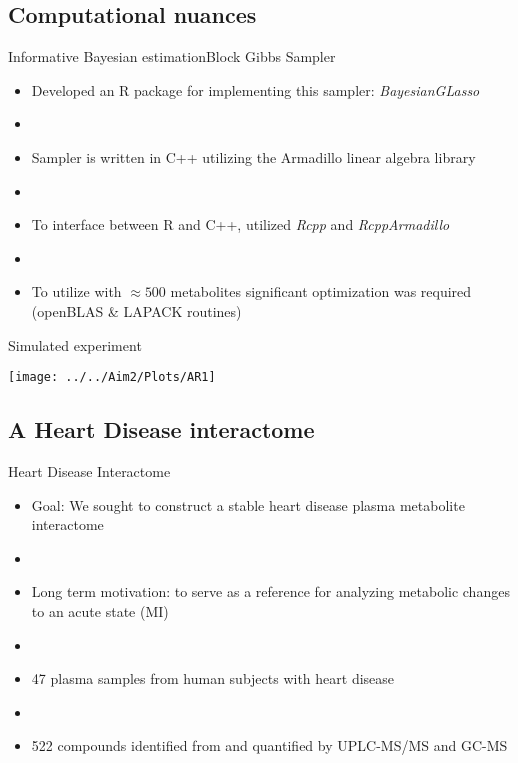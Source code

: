 \documentclass[xcolor=dvipsnames]{beamer}
\begin{document}
\subsection{Computational nuances}

\begin{frame}{Informative Bayesian estimation}{Block Gibbs Sampler}
	\vspace{-15.5pt}
	\begin{itemize}
		\item Developed an R package for implementing this sampler: \emph{BayesianGLasso} \pause
		\item[]
		\item Sampler is written in C++ utilizing the Armadillo linear algebra library \pause
		\item[]
		\item To interface between R and C++, utilized \emph{Rcpp} and \emph{RcppArmadillo} \pause
		\item[]
		\item To utilize with $\approx 500$ metabolites significant optimization was required (openBLAS \& LAPACK routines)
	\end{itemize}
\end{frame}

\begin{frame}{Simulated experiment}
	\begin{center}
		\texttt{[image: ../../Aim2/Plots/AR1]}
	\end{center}
\end{frame}

\subsection{A Heart Disease interactome}

\begin{frame}{Heart Disease Interactome}
	\vspace{-15.5pt}
	\begin{itemize}
		\item Goal: We sought to construct a stable heart disease plasma metabolite interactome \pause
		\item[]
		\item Long term motivation:  to serve as a reference for analyzing metabolic changes to an acute state (MI) \pause
		\item[]
		\item 47 plasma samples from human subjects with heart disease \pause
		\item[]
		\item 522 compounds identified from and quantified by UPLC-MS/MS and GC-MS
	\end{itemize}
\end{frame}
\end{document}
